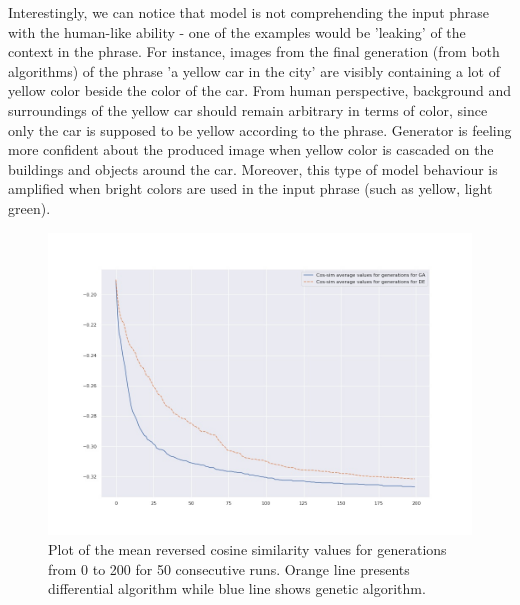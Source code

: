 \documentclass[12pt,a4paper,openany]{book}
\begin{document}
\noindent Interestingly, we can notice that model is not comprehending the input phrase with the human-like ability - one of the examples would be 'leaking' of the context in the phrase. For instance, images from the final generation (from both algorithms) of the phrase 'a yellow car in the city' are visibly containing a lot of yellow color beside the color of the car. From human perspective, background and surroundings of the yellow car should remain arbitrary in terms of color, since only the car is supposed to be yellow according to the phrase. Generator is feeling more confident about the produced image when yellow color is cascaded on the buildings and objects around the car. Moreover, this type of model behaviour is amplified when bright colors are used in the input phrase (such as yellow, light green).
\begin{figure}[h]
    \includegraphics[scale=0.45]{figs/avg_mean.jpg}
    \caption{Plot of the mean reversed cosine similarity values for generations from 0 to 200 for 50 consecutive runs. Orange line presents differential algorithm while blue line shows genetic algorithm.}\label{Fig:STYLEGAN}
\end{figure}
\end{document}
